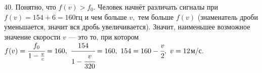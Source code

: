 40. Понятно, что $f(v)>f_0.$ Человек начнёт различать сигналы при $f(v)=154+6=160$гц и чем больше $v,$ тем больше $f(v)$ (знаменатель дроби уменьшается, значит вся дробь увеличивается). Значит, наименьшее возможное значение скорости $v$ --- это то, при котором $f(v)=\cfrac{f_0}{1-\frac{v}{c}}=160,\
\cfrac{154}{1-\cfrac{v}{320}}=160,\ 154=160-\cfrac{v}{2},\ v=12$м/с.\\

